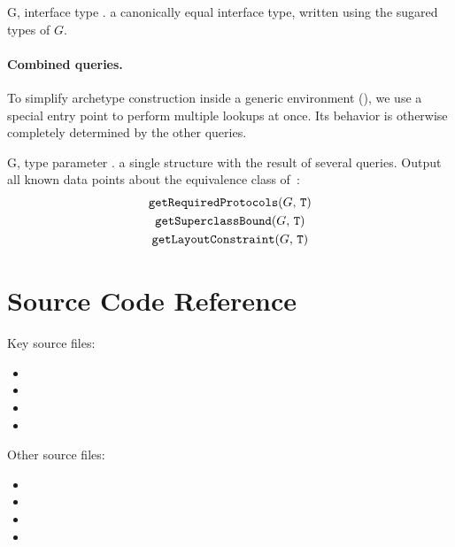 \documentclass[../generics]{subfiles}
\begin{document}
\begin{itemize}
{G, \tT}
{interface type \tT.}
{a canonically equal interface type, written using the sugared types of $G$.}
{}
\end{itemize}

\paragraph{Combined queries.} To simplify archetype construction inside a generic environment (), we use a special entry point to perform multiple lookups at once. Its behavior is otherwise completely determined by the other queries.

\begin{itemize}
{G, \tT}
{type parameter \tT.}
{a single structure with the result of several queries.}
{Output all known data points about the equivalence class of~\tT:
\begin{gather*}
\texttt{getRequiredProtocols}(G,\,\texttt{T})\\
\texttt{getSuperclassBound}(G,\,\texttt{T})\\
\texttt{getLayoutConstraint}(G,\,\texttt{T})
\end{gather*}}
\end{itemize}

\section{Source Code Reference}\label{src:generic signatures}

Key source files:
\begin{itemize}
\item {}
\item {}
\item {}
\item {}
\end{itemize}
Other source files:
\begin{itemize}
\item {}
\item {}
\item {}
\item {}
\end{itemize}
\end{document}
